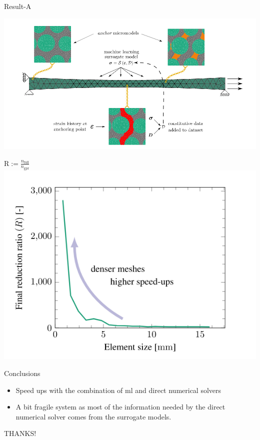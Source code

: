\documentclass[aspectratio=169]{beamer}
\begin{document}
\begin{frame}{Result-A}
  \begin{minipage}{0.5\textwidth}
    \includegraphics[width=1.1\textwidth]{Figures/anchor}
  \end{minipage}%
  \begin{minipage}{0.5\textwidth}
    \centering
    $\text{R}:= \frac{n_{\text{full}}}{n_{\text{gpr}}}$
    \includegraphics[width=1.1\textwidth]{Figures/result}
  \end{minipage}
\end{frame}

\begin{frame}{Conclusions}
  \begin{itemize}
    \item Speed ups with the combination of ml and direct numerical solvers 
    \item A bit fragile system as most of the information needed by the direct numerical solver comes from the surrogate models.
  \end{itemize}
\end{frame}

\begin{frame}
    \color{Pink} 
    \centering
     THANKS!
\end{frame}
\end{document}
